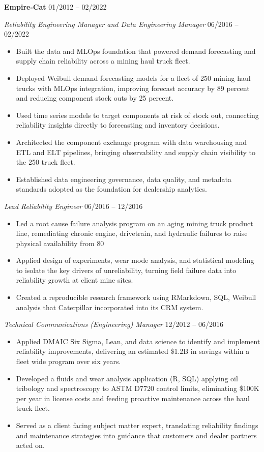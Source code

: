 \documentclass[10pt]{article}
\newcommand{\companyentry}[3]{%
  \smallskip\textbf{#1}\hspace{0.4em}{\color{slate}\small #2}\hfill{\color{slate}\small #3}\par}
\newcommand{\roledated}[2]{%
  \textit{#1}\hfill{\color{slate}\small #2}\par\vspace{1pt}}
\begin{document}
\companyentry{Empire-Cat }{Mesa, AZ}{01/2012 -- 02/2022}
\roledated{Reliability Engineering Manager and Data Engineering Manager }{06/2016 -- 02/2022}

\begin{itemize}
    \item Built the data and MLOps foundation that powered demand forecasting and supply chain reliability across a mining haul truck fleet.
    \item Deployed Weibull demand forecasting models for a fleet of 250 mining haul trucks with MLOps integration, improving forecast accuracy by 89 percent and reducing component stock outs by 25 percent.
    \item Used time series models to target components at risk of stock out, connecting reliability insights directly to forecasting and inventory decisions.
    \item Architected the component exchange program with data warehousing and ETL and ELT pipelines, bringing observability and supply chain visibility to the 250 truck fleet.
    \item Established data engineering governance, data quality, and metadata standards adopted as the foundation for dealership analytics.
\end{itemize}


\roledated{Lead Reliability Engineer }{06/2016 -- 12/2016}


\begin{itemize}
    \item Led a root cause failure analysis program on an aging mining truck product line, remediating chronic engine, drivetrain, and hydraulic failures to raise physical availability from 80%
    \item Applied design of experiments, wear mode analysis, and statistical modeling to isolate the key drivers of unreliability, turning field failure data into reliability growth at client mine sites.
    \item Created a reproducible research framework using RMarkdown, SQL, Weibull analysis that Caterpillar incorporated into its CRM system.
\end{itemize}

\roledated{Technical Communications (Engineering) Manager }{12/2012 -- 06/2016}
\begin{itemize}
    \item Applied DMAIC Six Sigma, Lean, and data science to identify and implement reliability improvements, delivering an estimated \$1.2B in savings within a fleet wide program over six years.
    \item Developed a fluids and wear analysis application (R, SQL) applying oil tribology and spectroscopy to ASTM D7720 control limits, eliminating \$100K per year in license costs and feeding proactive maintenance across the haul truck fleet.
    \item Served as a client facing subject matter expert, translating reliability findings and maintenance strategies into guidance that customers and dealer partners acted on.
\end{itemize}
\end{document}
